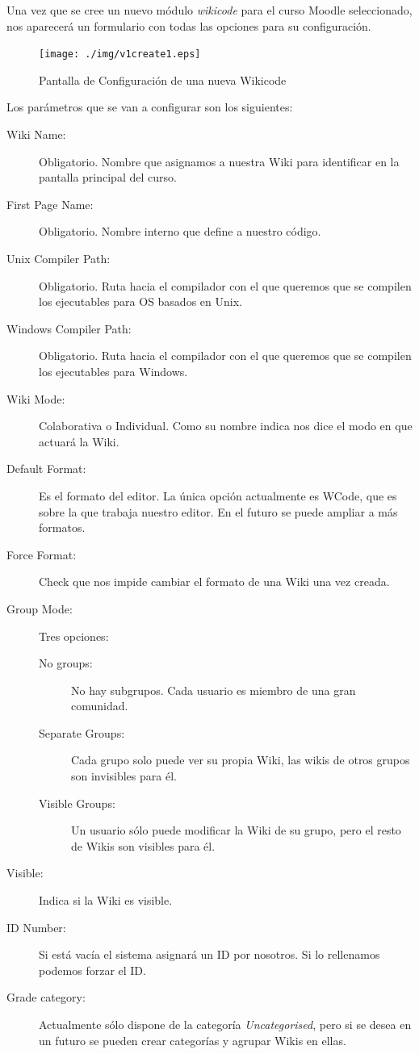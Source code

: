 \newpage

Una vez que se cree un nuevo módulo \emph{wikicode} para el curso Moodle seleccionado, nos aparecerá un formulario con todas las opciones para su configuración.

\begin{figure}[h]
	\label{v1create1.eps}
	\texttt{[image: ./img/v1create1.eps]}
	\caption{Pantalla de Configuración de una nueva Wikicode}
\end{figure}

Los parámetros que se van a configurar son los siguientes:

\begin{description}
	\item[Wiki Name:] Obligatorio. Nombre que asignamos a nuestra Wiki para identificar en la pantalla principal del curso.
	\item[First Page Name:] Obligatorio. Nombre interno que define a nuestro código.
	\item[Unix Compiler Path:] Obligatorio. Ruta hacia el compilador con el que queremos que se compilen los ejecutables para OS basados en Unix.
	\item[Windows Compiler Path:] Obligatorio. Ruta hacia el compilador con el que queremos que se compilen los ejecutables para Windows.
	\item[Wiki Mode:] Colaborativa o Individual. Como su nombre indica nos dice el modo en que actuará la Wiki.
	\item[Default Format:] Es el formato del editor. La única opción actualmente es WCode, que es sobre la que trabaja nuestro editor. En el futuro se puede ampliar a más formatos.
	\item[Force Format:] Check que nos impide cambiar el formato de una Wiki una vez creada.
	\item[Group Mode:] Tres opciones:
	\begin{description}
		\item[No groups:] No hay subgrupos. Cada usuario es miembro de una gran comunidad.
		\item[Separate Groups:] Cada grupo solo puede ver su propia Wiki, las wikis de otros grupos son invisibles para él.
		\item[Visible Groups:] Un usuario sólo puede modificar la Wiki de su grupo, pero el resto de Wikis son visibles para él.
	\end{description}
	\item[Visible:] Indica si la Wiki es visible.
	\item[ID Number:] Si está vacía el sistema asignará un ID por nosotros. Si lo rellenamos podemos forzar el ID.
	\item[Grade category:] Actualmente sólo dispone de la categoría \emph{Uncategorised}, pero si se desea en un futuro se pueden crear categorías y agrupar Wikis en ellas.
\end{description}

